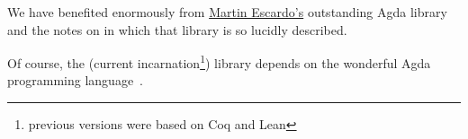 \documentclass[a4paper,UKenglish,cleveref, autoref, thm-restate]{lipics-v2019}
\begin{document}
We have benefited enormously from \href{https://www.cs.bham.ac.uk/~mhe}{Martin Escardo's} outstanding \typetopology Agda library and the notes on \hottufinagda in which that library is so lucidly described.

Of course, the (current incarnation\footnote{previous versions were based on Coq and Lean}) \agdaualib library depends on the wonderful Agda programming language~\cite{Norell:2009}.









\end{document}
